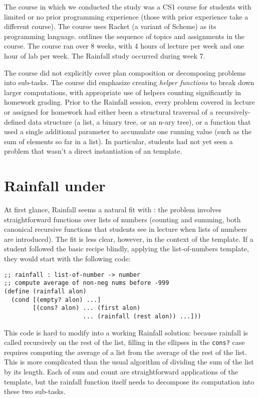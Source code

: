 The course in which we conducted the study was a CS1 course for
students with limited or no prior programming experience (those
with prior experience take a different course).  The
course uses Racket (a variant of Scheme) as its programming
language.  outlines the sequence of topics and
assignments in the course.  The course ran over 8 weeks, with 4 hours
of lecture per week and one hour of lab per week.  The Rainfall study
occurred during week 7.

The course did not explicitly cover plan composition or decomposing
problems into sub-tasks. The course did emphasize creating
\emph{helper functions} to break down larger computations, with
appropriate use of helpers counting significantly in homework grading.
Prior to the Rainfall session, every problem covered in lecture or
assigned for homework had either been a structural traversal of a
recursively-defined data structure (a list, a binary tree, or an n-ary
tree), or a function that used a single additional parameter to
accumulate one running value (such as the sum of elements so far in a
list). In particular, students had not yet seen a problem that wasn't
a direct instantiation of an \htdp template.

\section{Rainfall under \htdp}
\label{s:rainfall-htdp}

At first glance, Rainfall seems a natural fit with \htdp: the problem
involves straightforward functions over lists of numbers (counting and
summing, both canonical recursive functions that students see in
lecture when lists of numbers are introduced). The fit is less
clear, however, in the context of the
template.  If a student followed the basic recipe blindly,
applying the list-of-numbers template, they would start with the
following code:

\begin{lstlisting}
;; rainfall : list-of-number -> number
;; compute average of non-neg nums before -999
(define (rainfall alon)
  (cond [(empty? alon) ...]
        [(cons? alon) ... (first alon)
                      ... (rainfall (rest alon)) ...]))
\end{lstlisting}

This code is hard to modify into a working Rainfall solution: because
rainfall is called recursively on the rest of the list, filling in the
ellipses in the \lstinline{cons?} case requires computing the average of a list from the average of
the rest of the list.  This is more complicated than the usual
algorithm of dividing the sum of the list by its length.  Each of sum
and count are straightforward applications of the \htdp template, but
the rainfall function itself needs to decompose its computation into
these two sub-tasks.

